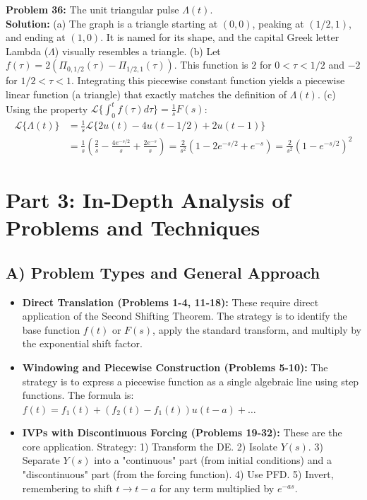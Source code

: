 \documentclass[11pt, letterpaper]{article}
\theoremstyle{definition}
\theoremstyle{remark}
\newcommand{\Lap}{\mathcal{L}}
\begin{document}
\textbf{Problem 36:} The unit triangular pulse $\Lambda(t)$.
\\[4pt]
\textbf{Solution:}
(a) The graph is a triangle starting at $(0,0)$, peaking at $(1/2, 1)$, and ending at $(1,0)$. It is named for its shape, and the capital Greek letter Lambda ($\Lambda$) visually resembles a triangle.
(b) Let $f(\tau) = 2(\Pi_{0,1/2}(\tau) - \Pi_{1/2,1}(\tau))$. This function is $2$ for $0<\tau<1/2$ and $-2$ for $1/2<\tau<1$. Integrating this piecewise constant function yields a piecewise linear function (a triangle) that exactly matches the definition of $\Lambda(t)$.
(c) Using the property $\Lap\{\int_0^t f(\tau)d\tau\} = \frac{1}{s}F(s)$:
\begin{align*}
\Lap\{\Lambda(t)\} &= \frac{1}{s} \Lap\{2u(t) - 4u(t-1/2) + 2u(t-1)\} \\
&= \frac{1}{s} \left( \frac{2}{s} - \frac{4e^{-s/2}}{s} + \frac{2e^{-s}}{s} \right) = \frac{2}{s^2}(1 - 2e^{-s/2} + e^{-s}) = \frac{2}{s^2}(1 - e^{-s/2})^2
\end{align*}

\newpage
\section{Part 3: In-Depth Analysis of Problems and Techniques}

\subsection{A) Problem Types and General Approach}
\begin{itemize}
    \item \textbf{Direct Translation (Problems 1-4, 11-18):} These require direct application of the Second Shifting Theorem. The strategy is to identify the base function $f(t)$ or $F(s)$, apply the standard transform, and multiply by the exponential shift factor.
    \item \textbf{Windowing and Piecewise Construction (Problems 5-10):} The strategy is to express a piecewise function as a single algebraic line using step functions. The formula is: $f(t) = f_1(t) + (f_2(t)-f_1(t))u(t-a) + \dots$
    \item \textbf{IVPs with Discontinuous Forcing (Problems 19-32):} These are the core application. Strategy: 1) Transform the DE. 2) Isolate $Y(s)$. 3) Separate $Y(s)$ into a "continuous" part (from initial conditions) and a "discontinuous" part (from the forcing function). 4) Use PFD. 5) Invert, remembering to shift $t \to t-a$ for any term multiplied by $e^{-as}$.
\end{itemize}
\end{document}
